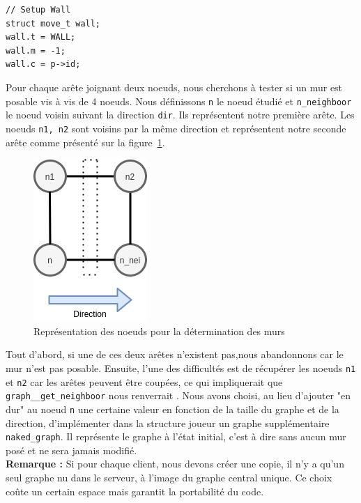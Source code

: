 \documentclass[a4paper]{article}
\begin{document}
\begin{lstlisting}[caption = {Initialisation des murs}, label = {algo:setup_wall}, float = h]
  // Setup Wall 
struct move_t wall; 
wall.t = WALL; 
wall.m = -1; 
wall.c = p->id; 
\end{lstlisting}

Pour chaque arête joignant deux noeuds, nous cherchons à tester si un mur est posable vis à vis de 4 noeuds. Nous définissons \texttt{n} le noeud étudié et \texttt{n\_neighboor} le noeud voisin suivant la direction \texttt{dir}. Ils représentent notre première arête. Les noeuds \texttt{n1, n2} sont voisins par la même direction et représentent notre seconde arête comme présenté sur la figure~\ref{fig:valid_walls1}. \\

\begin{figure}[h!]
    \centering
    \includegraphics[scale=0.65]{valid_walls1.png}
    \caption{Représentation des noeuds pour la détermination des murs}
    \label{fig:valid_walls1}
\end{figure}

Tout d'abord, si une de ces deux arêtes n'existent pas,nous abandonnons car le mur n'est pas posable. Ensuite, l'une des difficultés est de récupérer les noeuds \texttt{n1} et \texttt{n2} car les arêtes peuvent être coupées, ce qui impliquerait que \texttt{graph\_\_get\_neighboor} nous renverrait . Nous avons choisi, au lieu d'ajouter "en dur" au noeud \texttt{n} une certaine valeur en fonction de la taille du graphe et de la direction, d'implémenter dans la structure joueur un graphe supplémentaire \texttt{naked\_graph}. Il représente le graphe à l'état initial, c'est à dire sans aucun mur posé et ne sera jamais modifié. \\

\textbf{Remarque :} Si pour chaque client, nous devons créer une copie, il n'y a qu'un seul graphe nu dans le serveur, à l'image du graphe central unique. Ce choix coûte un certain espace mais garantit la portabilité du code. \\
\end{document}
